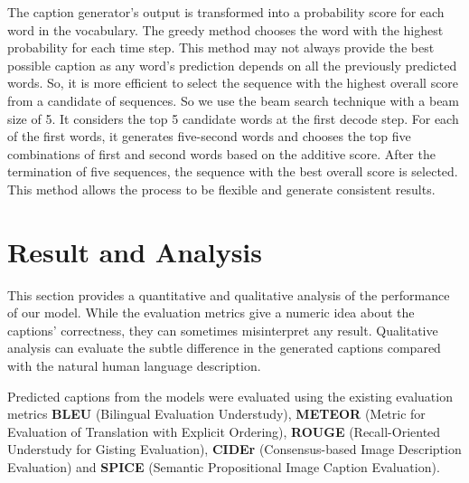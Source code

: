 \documentclass[runningheads]{llncs}
\begin{document}
The caption generator's output is transformed into a probability score for each word in the vocabulary. The greedy method chooses the word with the highest probability for each time step. This method may not always provide the best possible caption as any word's prediction depends on all the previously predicted words. So, it is more efficient to select the sequence with the highest overall score from a candidate of sequences. So we use the beam search technique with a beam size of 5. It considers the top 5 candidate words at the first decode step. For each of the first words, it generates five-second words and chooses the top five combinations of first and second words based on the additive score.  After the termination of five sequences, the sequence with the best overall score is selected. This method allows the process to be flexible and generate consistent results.

\section{Result and Analysis}
This section provides a quantitative and qualitative analysis of the performance of our model. While the evaluation metrics give a numeric idea about the captions' correctness, they can sometimes misinterpret any result. Qualitative analysis can evaluate the subtle difference in the generated captions compared with the natural human language description.

Predicted captions from the models were evaluated using the existing evaluation metrics \textbf{BLEU} \cite{bleu} (Bilingual Evaluation Understudy), \textbf{METEOR} \cite{meteor} (Metric for Evaluation of Translation with Explicit Ordering), \textbf{ROUGE} \cite{rouge} (Recall-Oriented Understudy for Gisting Evaluation), \textbf{CIDEr} \cite{cider} (Consensus-based Image Description Evaluation) and \textbf{SPICE} \cite{spice} (Semantic Propositional Image Caption Evaluation).
\end{document}
